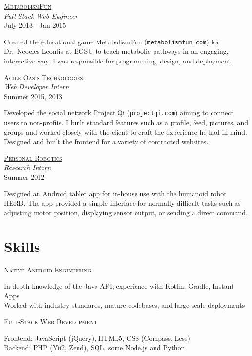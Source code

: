 \documentclass[letterpaper,10pt]{article}
\newcommand{\lb}{\vspace{4pt} \\}
\newenvironment{resumecols1}[1]
{
    \vspace{.1cm}
    \begin{minipage}[t]{.21\linewidth}
        \begin{flushright}
            \textsc{#1}
        \end{flushright}
    \end{minipage}
    \hspace{.005\linewidth}
    \begin{minipage}[t]{.77\linewidth}
}
{
    \end{minipage}
    \vspace{.1cm}
}
\newenvironment{resumecols}[4]
{
    \vspace{.1cm}
    \begin{minipage}[t]{.21\linewidth}
        \begin{flushright}
            \href{#2}{\textsc{#1}} \\
            \small{\textit{#3}} \\
            \small{#4}
        \end{flushright}
    \end{minipage}
    \hspace{.005\linewidth}
    \begin{minipage}[t]{.77\linewidth}
}
{
    \end{minipage}
    \vspace{.1cm}
}
\begin{document}
\begin{resumecols}{MetabolismFun}{http://metabolismfun.com}{Full-Stack Web Engineer}{July 2013 - Jan 2015}
    Created the educational game MetabolismFun (\href{http://metabolismfun.com}{\texttt{metabolismfun.com}}) for Dr.\ Neocles Leontis at BGSU to teach metabolic pathways in an engaging, interactive way. I was responsible for programming, design, and deployment.
\end{resumecols}

\begin{resumecols}{Agile Oasis Technologies}{http://agileoasis.com}{Web Developer Intern}{Summer 2015, 2013}
    Developed the social network Project Qi (\href{http://www.projectqi.com}{\texttt{projectqi.com}}) aiming to connect users to non-profits. I built standard features such as a profile, feed, pictures, and groups and worked closely with the client to craft the experience he had in mind.
    \lb
    Designed and built the frontend for a variety of contracted websites.
\end{resumecols}

\begin{resumecols}{Personal Robotics}{https://personalrobotics.ri.cmu.edu}{Research Intern}{Summer 2012}
    Designed an Android tablet app for in-house use with the humanoid robot HERB. The app provided a simple interface for normally difficult tasks such as adjusting motor position, displaying sensor output, or sending a direct command.
\end{resumecols}

\section{Skills}

\begin{resumecols1}{Native Android Engineering}
    In depth knowledge of the Java API; experience with Kotlin, Gradle, Instant Apps \\
    Worked with industry standards, mature codebases, and large-scale deployments
\end{resumecols1}

\begin{resumecols1}{Full-Stack Web Development}
    Frontend: JavaScript (jQuery), HTML5, CSS (Compass, Less) \\
    Backend: PHP (Yii2, Zend), SQL, some Node.js and Python
\end{resumecols1}
\end{document}
